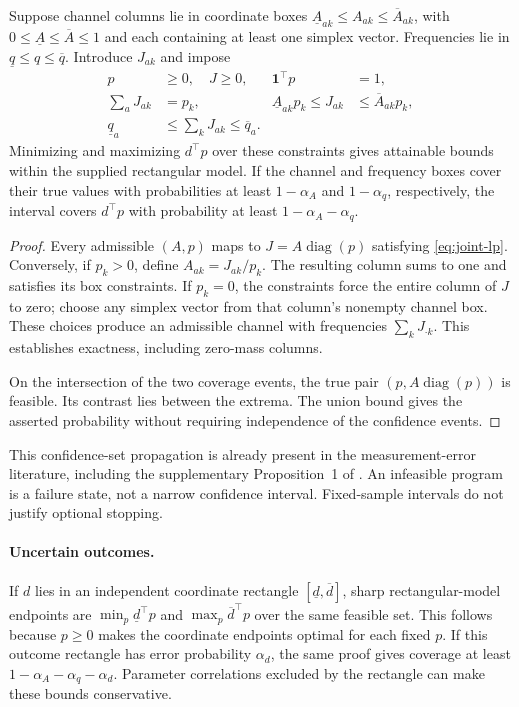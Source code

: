 \begin{proposition}
\label{prop:uncertainty-coverage}
Suppose channel columns lie in coordinate boxes
$\underline A_{ak}\leq A_{ak}\leq\overline A_{ak}$, with $0\leq\underline A\leq\overline A\leq1$ and each containing at least
one simplex vector. Frequencies lie in
$\underline q\leq q\leq\overline q$. Introduce $J_{ak}$ and impose
\begin{align}
 p&\geq0,\quad J\geq0, & \mathbf1^\top p&=1, \nonumber\\
 \sum_a J_{ak}&=p_k, &
 \underline A_{ak}p_k\leq J_{ak}&\leq\overline A_{ak}p_k,\label{eq:joint-lp}\\
 \underline q_a&\leq\sum_kJ_{ak}\leq\overline q_a. &&\nonumber
\end{align}
Minimizing and maximizing $d^\top p$ over these constraints gives attainable
bounds within the supplied rectangular model. If the channel and frequency
boxes cover their true values with probabilities at least $1-\alpha_A$ and
$1-\alpha_q$, respectively, the interval covers $d^\top p$ with probability
at least $1-\alpha_A-\alpha_q$.
\end{proposition}
\begin{proof}
Every admissible $(A,p)$ maps to $J=A\operatorname{diag}(p)$ satisfying
\eqref{eq:joint-lp}. Conversely, if $p_k>0$, define $A_{ak}=J_{ak}/p_k$.
The resulting column sums to one and satisfies its box constraints. If
$p_k=0$, the constraints force the entire column of $J$ to zero; choose any
simplex vector from that column's nonempty channel box. These choices produce
an admissible channel with frequencies $\sum_kJ_{\cdot k}$. This establishes
exactness, including zero-mass columns.

On the intersection of the two coverage events, the true pair
$(p,A\operatorname{diag}(p))$ is feasible. Its contrast lies between the extrema.
The union bound gives the asserted probability without requiring independence
of the confidence events.
\end{proof}

This confidence-set propagation is already present in the measurement-error
literature, including the supplementary Proposition~1 of
\citet{finkelstein2021}. An infeasible program is a failure state, not a narrow
confidence interval. Fixed-sample intervals do not justify optional stopping.

\paragraph{Uncertain outcomes.}
If $d$ lies in an independent coordinate rectangle
$[\underline d,\overline d]$, sharp rectangular-model endpoints are
$\min_p\underline d^\top p$ and $\max_p\overline d^\top p$ over the same
feasible set. This follows because $p\geq0$ makes the coordinate endpoints
optimal for each fixed $p$. If this outcome rectangle has error probability
$\alpha_d$, the same proof gives coverage at least
$1-\alpha_A-\alpha_q-\alpha_d$. Parameter correlations excluded by the
rectangle can make these bounds conservative.


